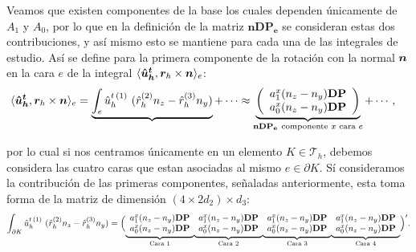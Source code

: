 \documentclass{article}
\begin{document}
\noindent Veamos que existen componentes de la base los cuales dependen únicamente de $A_1$ y $A_0$, por lo que en la definición de la matriz $\boldsymbol{nDP_e}$ se consideran estas dos contribuciones, y así mismo esto se mantiene para cada una de las integrales de estudio. Así se define para la primera componente de la rotación con la normal $\boldsymbol{n}$ en la cara $e$ de la integral $\langle \boldsymbol{\hat{u}_h^t}, \boldsymbol{r}_h \times \boldsymbol{n} \rangle_{e}$:
\begin{align*}
    \langle \boldsymbol{\hat{u}_h^t}, \boldsymbol{r}_h \times \boldsymbol{n} \rangle_{e} &= \underbrace{\int_e \hat{u}_h^{t\,(1)}~(\hat{r}_h^{(2)} n_z - \hat{r}_h^{(3)} n_y)} + \cdots \approx \underbrace{\left ( \begin{array}{cc}
    a^x_1 ( n_z - n_y ) \mathbf{DP} \\ a^x_0 ( n_z - n_y ) \mathbf{DP}
    \end{array}\right)}_{\mathbf{nDP_e}~\text{componente $x$ cara $e$}} + \cdots,
\end{align*}

\noindent por lo cual si nos centramos únicamente en un elemento $K \in \mathcal{T}_h$, debemos considera las cuatro caras que estan asociadas al mismo $e \in \partial K$. Sí consideramos la contribución de las primeras componentes, señaladas anteriormente, esta toma forma de la matriz de dimensión $(4 \times 2 d_2) \times d_3$:
\begin{align*}
    \int_{\partial K} \hat{u}_h^{t\,(1)}~(\hat{r}_h^{(2)} n_z-\hat{r}_h^{(3)} n_y) =
    \Bigl(
    \smash{\underbrace{\begin{array}{cc}
        a^x_1 ( n_z - n_y ) \mathbf{DP} \\ a^x_0 ( n_z - n_y ) \mathbf{DP}
    \end{array}}_{\text{Cara 1}}}
    \smash{\underbrace{\begin{array}{cc}
        a^x_1 ( n_z - n_y ) \mathbf{DP} \\ a^x_0 ( n_z - n_y ) \mathbf{DP}
    \end{array}}_{\text{Cara 2}}}
    \smash{\underbrace{\begin{array}{cc}
        a^x_1 ( n_z - n_y ) \mathbf{DP} \\ a^x_0 ( n_z - n_y ) \mathbf{DP}
    \end{array}}_{\text{Cara 3}}}
    \smash{\underbrace{\begin{array}{cc}
        a^x_1 ( n_z - n_y ) \mathbf{DP} \\ a^x_0 ( n_z - n_y ) \mathbf{DP}
    \end{array}}_{\text{Cara 4}}}
    \Bigr )'. \\
\end{align*}
\end{document}
